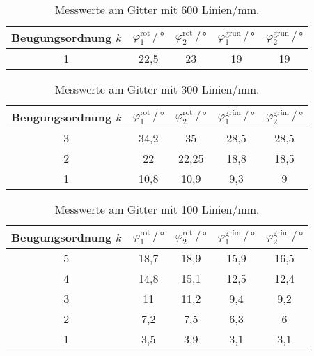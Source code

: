 \begin{table}
	\centering
	\caption{Messwerte am Gitter mit 600 Linien/mm.}
	\label{tab:600}
	\begin{tabular}{c c c c c}
		\toprule
		Beugungsordnung $k$ &
		$\varphi_1^\text{rot}  \, / \, ° $  &
		$\varphi_2^\text{rot}  \, / \, ° $  &
		$\varphi_1^\text{grün} \, / \, ° $  &
		$\varphi_2^\text{grün} \, / \, ° $  \\
		\midrule
		1 & 22,5    & 23  &  19 & 19 \\
	\end{tabular}
\end{table}
\begin{table}
	\centering
	\caption{Messwerte am Gitter mit 300 Linien/mm.}
	\label{tab:300}
	\begin{tabular}{c c c c c}
		\toprule
		Beugungsordnung $k$ &
		$\varphi_1^\text{rot}  \, / \, ° $   &
		$\varphi_2^\text{rot}  \, / \, ° $   &
		$\varphi_1^\text{grün} \, / \, ° $  &
		$\varphi_2^\text{grün} \, / \, ° $  \\
		\midrule
		3 & 34,2    & 35  &  28,5   & 28,5 \\
		2 & 22 & 22,25   &  18,8 & 18,5 \\
        1 & 10,8 & 10,9   &  9,3 & 9 \\
		\bottomrule
	\end{tabular}
\end{table}
\begin{table}
	\centering
	\caption{Messwerte am Gitter mit 100 Linien/mm.}
	\label{tab:100}
	\begin{tabular}{c c c c c}
		\toprule
		Beugungsordnung $k$ &
		$\varphi_1^\text{rot}  \, / \, ° $   &
		$\varphi_2^\text{rot}  \, / \, ° $   &
		$\varphi_1^\text{grün} \, / \, ° $   &
		$\varphi_2^\text{grün} \, / \, ° $  \\
		\midrule
		5 & 18,7 & 18,9 & 15,9 & 16,5 \\
        4 & 14,8 & 15,1 & 12,5 & 12,4 \\
        3 & 11 & 11,2 & 9,4 & 9,2 \\
        2 & 7,2 & 7,5 & 6,3 & 6 \\
        1 & 3,5 & 3,9 & 3,1 & 3,1 \\
		\bottomrule
	\end{tabular}
\end{table}


